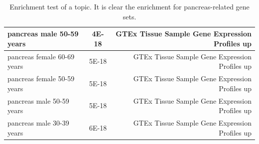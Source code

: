 \begin{table}[htb!]
\begin{center}
\begin{tabular}{|l|c|r|}
			pancreas male 50-59 years & 4E-18 & GTEx Tissue Sample Gene Expression Profiles up \\ \hline
			pancreas female 60-69 years & 5E-18 & GTEx Tissue Sample Gene Expression Profiles up \\ \hline
			pancreas female 50-59 years & 5E-18 & GTEx Tissue Sample Gene Expression Profiles up \\ \hline
			pancreas male 50-59 years & 5E-18 & GTEx Tissue Sample Gene Expression Profiles up \\ \hline
			pancreas male 30-39 years & 6E-18 & GTEx Tissue Sample Gene Expression Profiles up \\ \hline
		\end{tabular}
	\end{center}
	\caption{Enrichment test of a topic. It is clear the enrichment for pancreas-related gene sets.}
	\label{tab:topic/enrich/pancreas}
\end{table}
